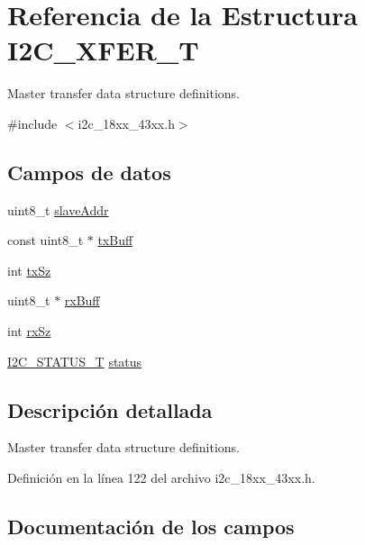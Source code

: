 \hypertarget{struct_i2_c___x_f_e_r___t}{}\section{Referencia de la Estructura I2\+C\+\_\+\+X\+F\+E\+R\+\_\+T}
\label{struct_i2_c___x_f_e_r___t}


Master transfer data structure definitions.  




{\ttfamily \#include $<$i2c\+\_\+18xx\+\_\+43xx.\+h$>$}

\subsection*{Campos de datos}
\begin{DoxyCompactItemize}
\item 
uint8\+\_\+t \hyperlink{struct_i2_c___x_f_e_r___t_a771bfcb0b066269afae6905ce5804c89}{slave\+Addr}
\item 
const uint8\+\_\+t $\ast$ \hyperlink{struct_i2_c___x_f_e_r___t_aa273a5a6ef5e2426562692030769f5d8}{tx\+Buff}
\item 
int \hyperlink{struct_i2_c___x_f_e_r___t_a3d14f9d3bba338401b8f8b0ff6ec0ea0}{tx\+Sz}
\item 
uint8\+\_\+t $\ast$ \hyperlink{struct_i2_c___x_f_e_r___t_a0aa410ff8cbc01a00b2fa2189e1c2938}{rx\+Buff}
\item 
int \hyperlink{struct_i2_c___x_f_e_r___t_a745e2b08d1a5413929a13d9aa30137c5}{rx\+Sz}
\item 
\hyperlink{group___i2_c__18_x_x__43_x_x_ga21aa839302786105dcf6a96be0e6e8bc}{I2\+C\+\_\+\+S\+T\+A\+T\+U\+S\+\_\+T} \hyperlink{struct_i2_c___x_f_e_r___t_a30a194e0acd94c980e171b51999d2aa8}{status}
\end{DoxyCompactItemize}


\subsection{Descripción detallada}
Master transfer data structure definitions. 

Definición en la línea 122 del archivo i2c\+\_\+18xx\+\_\+43xx.\+h.



\subsection{Documentación de los campos}
